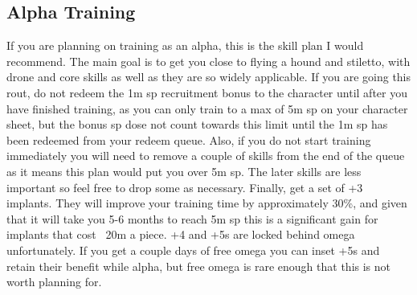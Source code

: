 \documentclass{article}
\begin{document}
\clearpage
\subsection{Alpha Training}
If you are planning on training as an alpha, this is the skill plan I would recommend. The main goal is to get you close to flying a hound and stiletto,
with drone and core skills as well as they are so widely applicable. If you are going this rout, do not redeem the 1m sp recruitment bonus to the 
character until after you have finished training, as you can only train to a max of 5m sp on your character sheet, but the bonus sp dose not count
towards this limit until the 1m sp has been redeemed from your redeem queue. Also, if you do not start training immediately you will need to remove
a couple of skills from the end of the queue as it means this plan would put you over 5m sp. The later skills are less important so feel free to drop 
some as necessary. Finally, get a set of +3 implants. They will improve your training time by approximately 30\%, and given that it will take you 5-6 months
to reach 5m sp this is a significant gain for implants that cost ~20m a piece. +4 and +5s are locked behind omega unfortunately. If you get a couple days
of free omega you can inset +5s and retain their benefit while alpha, but free omega is rare enough that this is not worth planning for.
\end{document}
